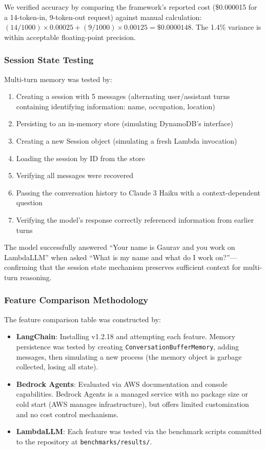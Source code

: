 \documentclass[11pt,a4paper]{article}
\begin{document}
We verified accuracy by comparing the framework's reported cost (\$0.000015 for a 14-token-in, 9-token-out request) against manual calculation: $(14/1000) \times 0.00025 + (9/1000) \times 0.00125 = \$0.0000148$. The 1.4\% variance is within acceptable floating-point precision.

\subsubsection{Session State Testing}

Multi-turn memory was tested by:
\begin{enumerate}
    \item Creating a session with 5 messages (alternating user/assistant turns containing identifying information: name, occupation, location)
    \item Persisting to an in-memory store (simulating DynamoDB's interface)
    \item Creating a new Session object (simulating a fresh Lambda invocation)
    \item Loading the session by ID from the store
    \item Verifying all messages were recovered
    \item Passing the conversation history to Claude 3 Haiku with a context-dependent question
    \item Verifying the model's response correctly referenced information from earlier turns
\end{enumerate}

The model successfully answered ``Your name is Gaurav and you work on LambdaLLM'' when asked ``What is my name and what do I work on?''---confirming that the session state mechanism preserves sufficient context for multi-turn reasoning.

\subsubsection{Feature Comparison Methodology}

The feature comparison table was constructed by:
\begin{itemize}
    \item \textbf{LangChain}: Installing v1.2.18 and attempting each feature. Memory persistence was tested by creating \texttt{ConversationBufferMemory}, adding messages, then simulating a new process (the memory object is garbage collected, losing all state).
    \item \textbf{Bedrock Agents}: Evaluated via AWS documentation and console capabilities. Bedrock Agents is a managed service with no package size or cold start (AWS manages infrastructure), but offers limited customization and no cost control mechanisms.
    \item \textbf{LambdaLLM}: Each feature was tested via the benchmark scripts committed to the repository at \texttt{benchmarks/results/}.
\end{itemize}
\end{document}
